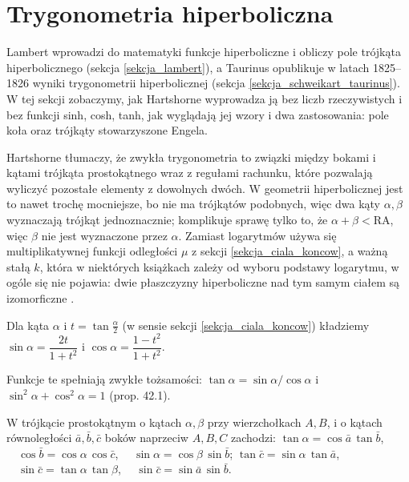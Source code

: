 \section{Trygonometria hiperboliczna} %
\label{sekcja_trygonometria}

Lambert wprowadzi do matematyki funkcje hiperboliczne i obliczy pole trójkąta hiperbolicznego (sekcja \ref{sekcja_lambert}), a Taurinus opublikuje w latach 1825--1826 wyniki trygonometrii hiperbolicznej (sekcja \ref{sekcja_schweikart_taurinus}). %
W tej sekcji zobaczymy, jak Hartshorne wyprowadza ją bez liczb rzeczywistych i bez funkcji sinh, cosh, tanh, jak wyglądają jej wzory i dwa zastosowania: pole koła oraz trójkąty stowarzyszone Engela. %

Hartshorne \cite[s. 403--404]{hartshorne_2000} tłumaczy, że zwykła trygonometria to związki między bokami i kątami trójkąta prostokątnego wraz z regułami rachunku, które pozwalają wyliczyć pozostałe elementy z dowolnych dwóch. %
W geometrii hiperbolicznej jest to nawet trochę mocniejsze, bo nie ma trójkątów podobnych, więc dwa kąty $\alpha, \beta$ wyznaczają trójkąt jednoznacznie; komplikuje sprawę tylko to, że $\alpha + \beta < \mathrm{RA}$, więc $\beta$ nie jest wyznaczone przez $\alpha$. %
Zamiast logarytmów używa się multiplikatywnej funkcji odległości $\mu$ z sekcji \ref{sekcja_ciala_koncow}, a ważną stałą $k$, która w niektórych książkach zależy od wyboru podstawy logarytmu, w ogóle się nie pojawia: dwie płaszczyzny hiperboliczne nad tym samym ciałem są izomorficzne \cite[s. 296, 404]{hartshorne_2000}. %

\begin{definition}
	Dla kąta $\alpha$ i $t = \tan\tfrac{\alpha}{2}$ (w sensie sekcji \ref{sekcja_ciala_koncow}) kładziemy $\sin\alpha = \dfrac{2t}{1+t^2}$ i $\cos\alpha = \dfrac{1-t^2}{1+t^2}$. %
\end{definition}

Funkcje te spełniają zwykłe tożsamości: $\tan\alpha = \sin\alpha/\cos\alpha$ i $\sin^2\alpha + \cos^2\alpha = 1$ \cite[s. 405--406]{hartshorne_2000} (prop. 42.1). %

\begin{theorem}
	W trójkącie prostokątnym o kątach $\alpha, \beta$ przy wierzchołkach $A, B$, i o kątach równoległości $\bar a, \bar b, \bar c$ boków naprzeciw $A, B, C$ zachodzi: %
	$\tan\alpha = \cos\bar a\,\tan\bar b$, $\quad \cos\bar b = \cos\alpha\,\cos\bar c$, $\quad \sin\alpha = \cos\beta\,\sin\bar b$; %
	$\tan\bar c = \sin\alpha\,\tan\bar a$, $\quad \sin\bar c = \tan\alpha\,\tan\beta$, $\quad \sin\bar c = \sin\bar a\,\sin\bar b$. %
\end{theorem}

